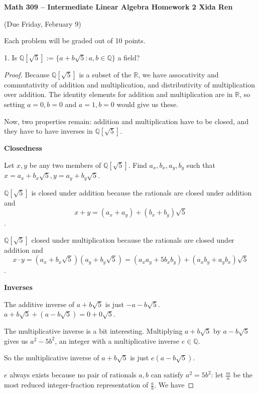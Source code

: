 \documentclass[12pt]{article} %
\newcommand{\Q}{\mathbb{Q}}
\newcommand{\R}{\mathbb{R}}
\begin{document}
 
\noindent
\textbf{Math 309 -- Intermediate Linear Algebra \quad 
Homework 2 \hfill Xida Ren}\\
\begin{center}
  (Due Friday, February 9)
\end{center}
\medskip

Each problem will be graded out of 10 points.

\vspace{1cm}

\begin{flushleft}

1.  Is $\Q[\sqrt{5}] := \{a + b\sqrt{5} : a, b \in \Q\}$ a field?\\

\vspace{0.5cm}
\begin{proof}
  Because $\Q[\sqrt{5}]$ is a subset of the $\R$, we have assocativity and commutativity of addition and multiplication, and distributivity of multiplication over addition. The identity elements for addition and multiplication are in $\R$, so setting $a=0, b=0$ and $a=1, b=0$ would give us these.
  
  Now, two properties remain: addition and multiplication have to be closed, and they have to have inverses in $\Q[\sqrt5]$.

  \textbf{Closedness}
  
  Let $x, y$ be any two members of $\Q[\sqrt{5}]$. Find $a_x, b_x, a_y, b_y$ such that $x = a_x+b_x\sqrt{5}, y = a_y+b_y\sqrt{5}$.

  $\Q[\sqrt5]$ is closed under addition because the rationals are closed under addition and $$x+y = (a_x + a_y) + (b_x + b_y)\sqrt5$$.

  $\Q[\sqrt5]$ closed under multiplication because the rationals are closed under addition and
  $$x\cdot y = (a_x+b_x\sqrt{5})(a_y+b_y\sqrt{5}) = (a_x a_y + 5b_x b_y) + (a_x b_y + a_y b_x)\sqrt5$$.

  \textbf{Inverses}
  
  The additive inverse of $a+b\sqrt5$ is just $-a-b\sqrt5$. $a+b\sqrt5 + (a-b\sqrt5) = 0+0\sqrt5$.
  
  The multiplicative inverse is a bit interesting. Multiplying $a+b\sqrt5$ by $a-b\sqrt5$ gives us $a^2 - 5b^2$, an integer with a multiplicative inverse $e\in \Q$.
  
  So the multiplicative inverse of $a+b\sqrt5$ is just $e(a-b\sqrt5)$.
  
  $e$ always exists because no pair of rationals $a, b$ can satisfy $a^2 = 5b^2$: let $\frac{m}{n}$ be the most reduced integer-fraction representation of $\frac{a}{b}$. We have 


\end{proof}
\end{flushleft}
\end{document}
